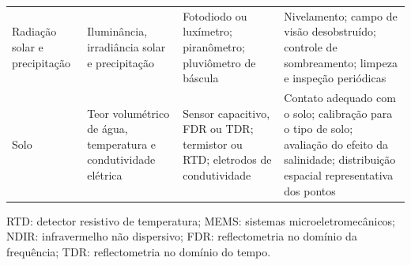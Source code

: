 \begin{table}[!t]
\begin{tabularx}{\textwidth}{
    @{}
    L{2.0cm}
    L{3.6cm}
    Y
    Y
    @{}
}
\addlinespace

Radiação solar e precipitação
\cite{5597912} &
Iluminância, irradiância solar e precipitação &
Fotodiodo ou luxímetro; piranômetro; pluviômetro de báscula &
Nivelamento; campo de visão desobstruído; controle de sombreamento; limpeza e inspeção periódicas \\

\addlinespace

Solo
\cite{5597912,s23146332} &
Teor volumétrico de água, temperatura e condutividade elétrica &
Sensor capacitivo, FDR ou TDR; termistor ou RTD; eletrodos de condutividade &
Contato adequado com o solo; calibração para o tipo de solo; avaliação do efeito da salinidade; distribuição espacial representativa dos pontos \\

\bottomrule
\end{tabularx}

\vspace{3pt}
\parbox{\textwidth}{\footnotesize
RTD: detector resistivo de temperatura;
MEMS: sistemas microeletromecânicos;
NDIR: infravermelho não dispersivo;
FDR: reflectometria no domínio da frequência;
TDR: reflectometria no domínio do tempo.
}
\end{table}